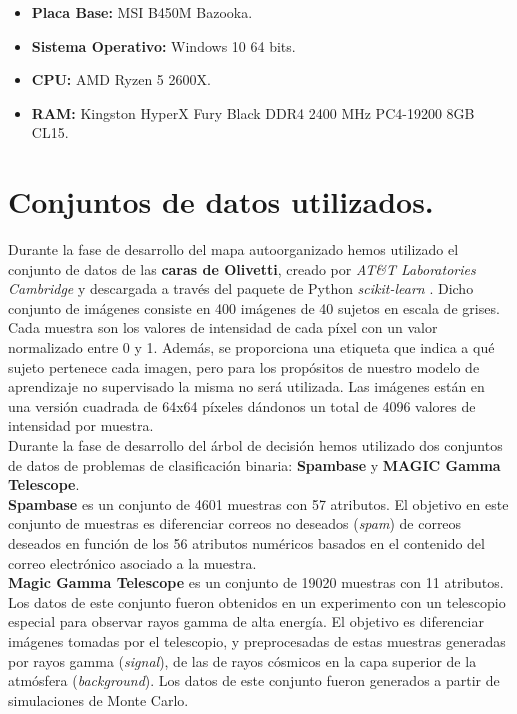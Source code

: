\begin{itemize}
	\item \textbf{Placa Base:} MSI B450M Bazooka.
	\item \textbf{Sistema Operativo:} Windows 10 64 bits.
	\item \textbf{CPU:} AMD Ryzen 5 2600X.
	\item \textbf{RAM:} Kingston HyperX Fury Black DDR4 2400 MHz PC4-19200 8GB CL15.
\end{itemize}
\section{Conjuntos de datos utilizados.}

Durante la fase de desarrollo del mapa autoorganizado hemos utilizado el conjunto de datos de las \textbf{caras de Olivetti}, creado por \textit{AT\&T Laboratories Cambridge} y descargada a través del paquete de Python \textit{scikit-learn} \cite{olivetti}. Dicho conjunto de imágenes consiste en 400 imágenes de 40 sujetos en escala de grises. Cada muestra son los valores de intensidad de cada píxel con un valor normalizado entre 0 y 1. Además, se proporciona una etiqueta que indica a qué sujeto pertenece cada imagen, pero para los propósitos de nuestro modelo de aprendizaje no supervisado la misma no será utilizada. Las imágenes están en una versión cuadrada de 64x64 píxeles dándonos un total de 4096 valores de intensidad por muestra. \\

Durante la fase de desarrollo del árbol de decisión hemos utilizado dos conjuntos de datos de problemas de clasificación binaria: \textbf{Spambase} y \textbf{MAGIC Gamma Telescope}.\\

\textbf{Spambase} \cite{spambase} es un conjunto de 4601 muestras con 57 atributos. El objetivo en este conjunto de muestras es diferenciar correos no deseados (\textit{spam}) de correos deseados en función de los 56 atributos numéricos basados en el contenido del correo electrónico asociado a la muestra.\\

\textbf{Magic Gamma Telescope} \cite{magic04} es un conjunto de 19020 muestras con 11 atributos. Los datos de este conjunto fueron obtenidos en un experimento con un telescopio especial para observar rayos gamma de alta energía. El objetivo es diferenciar imágenes tomadas por el telescopio, y preprocesadas de estas muestras generadas por rayos gamma (\textit{signal}), de las de rayos cósmicos en la capa superior de la atmósfera (\textit{background}). Los datos de este conjunto fueron generados a partir de simulaciones de Monte Carlo.\\

